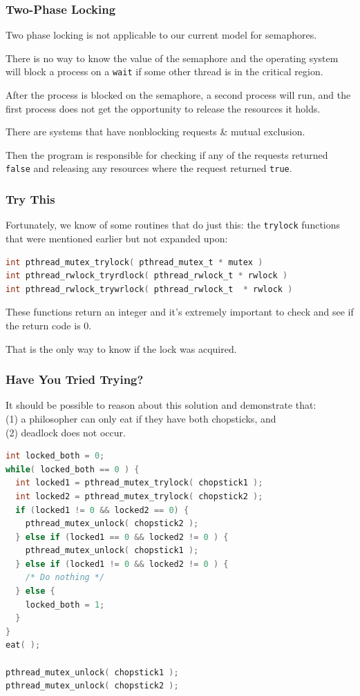 \begin{frame}
	\frametitle{Two-Phase Locking}

	Two phase locking is not applicable to our current model for semaphores.

	There is no way to know the value of the semaphore and the operating system will block a process on a \texttt{wait} if some other thread is in the critical region.

	After the process is blocked on the semaphore, a second process will run, and the first process does not get the opportunity to release the resources it holds.

	There are systems that have nonblocking requests \& mutual exclusion.

	Then the program is responsible for checking if any of the requests returned \texttt{false} and releasing any resources where the request returned \texttt{true}.


\end{frame}


\begin{frame}[fragile]
	\frametitle{Try This}
	Fortunately, we know of some routines that do just this: the \texttt{trylock} functions that were mentioned earlier but not expanded upon:
	\begin{lstlisting}[language=C]
int pthread_mutex_trylock( pthread_mutex_t * mutex )
int pthread_rwlock_tryrdlock( pthread_rwlock_t * rwlock )
int pthread_rwlock_trywrlock( pthread_rwlock_t  * rwlock )
\end{lstlisting}

	These functions return an integer and it's extremely important to check and see if the return code is 0.

	That is the only way to know if the lock was acquired.

\end{frame}


\begin{frame}[fragile]
	\frametitle{Have You Tried Trying?}

	It should be possible to reason about this solution and demonstrate that:\\
	\quad (1) a philosopher can only eat if they have both chopsticks, and\\
	\quad (2) deadlock does not occur.

	\begin{lstlisting}[language=C]
int locked_both = 0;
while( locked_both == 0 ) {
  int locked1 = pthread_mutex_trylock( chopstick1 );
  int locked2 = pthread_mutex_trylock( chopstick2 );
  if (locked1 != 0 && locked2 == 0) {
    pthread_mutex_unlock( chopstick2 );
  } else if (locked1 == 0 && locked2 != 0 ) {
    pthread_mutex_unlock( chopstick1 );
  } else if (locked1 != 0 && locked2 != 0 ) {
    /* Do nothing */
  } else {
    locked_both = 1;
  }
}
eat( );

pthread_mutex_unlock( chopstick1 );
pthread_mutex_unlock( chopstick2 );
\end{lstlisting}

\end{frame}

